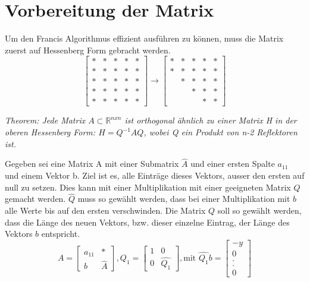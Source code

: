 %
%
%
\section{Vorbereitung der Matrix\label{francis:section:vorbereitung}}
Um den Francis Algorithmus effizient ausführen zu können, muss die Matrix zuerst auf Hessenberg Form gebracht werden.
\begin{equation}
	\begin{bmatrix}
	* & * & * & * & * \\
	* & * & * & * & * \\
	*& * & * & * & * \\
	*&  * & * & * & * \\
	*&  * &  * & * & *
	\end{bmatrix} \rightarrow
	\begin{bmatrix}
	* & * & * & * & * \\
	* & * & * & * & * \\
	& * & * & * & * \\
	&   & * & * & * \\
	&   &   & * & *
	\end{bmatrix}
\end{equation}

\begin{satz}
	\emph{Theorem: Jede Matrix $ A \subset \mathbb{R} ^{n x n} $ ist orthogonal ähnlich zu einer Matrix H in der oberen Hessenberg Form: $ H=Q^{-1}AQ $, wobei Q ein Produkt von n-2 Reflektoren ist.}
\end{satz}

Gegeben sei eine Matrix A mit einer Submatrix $\hat{A}$  und einer ersten Spalte $a_{11}$ und einem Vektor b.
Ziel ist es, alle Einträge dieses Vektors, ausser den ersten auf null zu setzen.
Dies kann mit einer Multiplikation mit einer geeigneten Matrix $Q$ gemacht werden. $\hat{Q}$ muss so gewählt werden, dass bei einer Multiplikation mit $b$ alle Werte bis auf den ersten verschwinden.
Die Matrix $Q$ soll so gewählt werden, dass die Länge des neuen Vektors, bzw. dieser einzelne Eintrag, der Länge des Vektors $b$ entspricht.
\begin{equation}
	A=
	\begin{bmatrix}
	a_{11} & *\\
	b & \hat{A}
	\end{bmatrix},
	Q_{1}=
	\begin{bmatrix}
	1 & 0\\
	0 & \hat{Q_1}
	\end{bmatrix},
	\text{mit } \hat{Q_1}b=
	\begin{bmatrix}
	-y\\
	0\\
	.\\
	.\\
	0
	\end{bmatrix}
\end{equation}


